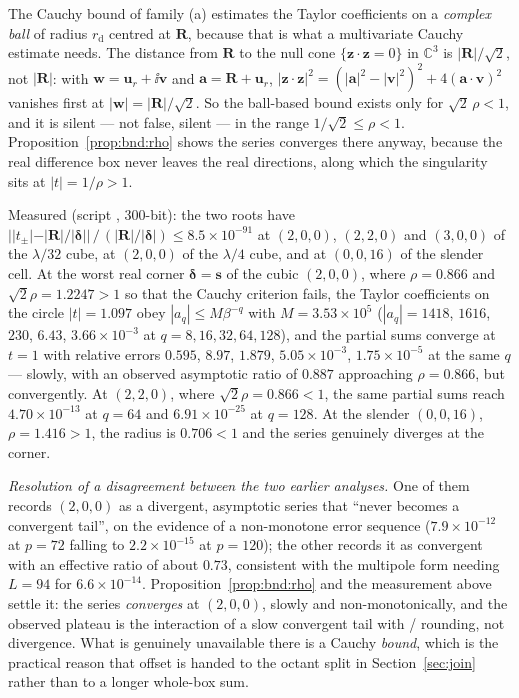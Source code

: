 \begin{remark}
\label{rem:bnd:two}
The Cauchy bound of family (a) estimates the Taylor coefficients on a \emph{complex ball}
of radius $r_{\mathrm{d}}$ centred at $\mathbf{R}$, because that is what a multivariate
Cauchy estimate needs. The distance from $\mathbf{R}$ to the null cone
$\{\mathbf{z}\cdot\mathbf{z} = 0\}$ in $\mathbb{C}^3$ is $|\mathbf{R}|/\sqrt2$, not
$|\mathbf{R}|$: with $\mathbf{w} = \mathbf{u}_r + \ii\mathbf{v}$ and
$\mathbf{a} = \mathbf{R}+\mathbf{u}_r$, $|\mathbf{z}\cdot\mathbf{z}|^2 =
(|\mathbf{a}|^2-|\mathbf{v}|^2)^2 + 4(\mathbf{a}\cdot\mathbf{v})^2$ vanishes first at
$|\mathbf{w}| = |\mathbf{R}|/\sqrt2$. So the ball-based bound exists only for
$\sqrt2\,\rho < 1$, and it is silent --- not false, silent --- in the range
$1/\sqrt2 \le \rho < 1$. Proposition~\ref{prop:bnd:rho} shows the series converges there
anyway, because the real difference box never leaves the real directions, along which the
singularity sits at $|t| = 1/\rho > 1$.

Measured (script , $300$-bit): the two roots have
$||t_\pm| - |\mathbf{R}|/|\boldsymbol{\delta}||\,/\,(|\mathbf{R}|/|\boldsymbol{\delta}|)
\le 8.5\times10^{-91}$ at $(2,0,0)$, $(2,2,0)$ and $(3,0,0)$ of the $\lambda/32$ cube, at
$(2,0,0)$ of the $\lambda/4$ cube, and at $(0,0,16)$ of the slender cell. At the worst
real corner $\boldsymbol{\delta} = \mathbf{s}$ of the cubic $(2,0,0)$, where
$\rho = 0.866$ and $\sqrt2\rho = 1.2247 > 1$ so that the Cauchy criterion fails, the
Taylor coefficients on the circle $|t| = 1.097$ obey $|a_q| \le M\beta^{-q}$ with
$M = 3.53\times10^{5}$ ($|a_q| = 1418$, $1616$, $230$, $6.43$, $3.66\times10^{-3}$ at
$q = 8,16,32,64,128$), and the partial sums converge at $t = 1$ with relative errors
$0.595$, $8.97$, $1.879$, $5.05\times10^{-3}$, $1.75\times10^{-5}$ at the same $q$ ---
slowly, with an observed asymptotic ratio of $0.887$ approaching $\rho = 0.866$, but
convergently. At $(2,2,0)$, where $\sqrt2\rho = 0.866 < 1$, the same partial sums reach
$4.70\times10^{-13}$ at $q = 64$ and $6.91\times10^{-25}$ at $q = 128$. At the slender
$(0,0,16)$, $\rho = 1.416 > 1$, the radius is $0.706 < 1$ and the series genuinely
diverges at the corner.

\emph{Resolution of a disagreement between the two earlier analyses.} One of them records
$(2,0,0)$ as a divergent, asymptotic series that ``never becomes a convergent tail'', on
the evidence of a non-monotone  error sequence
($7.9\times10^{-12}$ at $p = 72$ falling to $2.2\times10^{-15}$ at $p = 120$); the other
records it as convergent with an effective ratio of about $0.73$, consistent with the
multipole form needing $L = 94$ for $6.6\times10^{-14}$. Proposition~\ref{prop:bnd:rho}
and the measurement above settle it: the series \emph{converges} at $(2,0,0)$, slowly and
non-monotonically, and the observed plateau is the interaction of a slow convergent tail
with / rounding, not divergence. What is genuinely
unavailable there is a Cauchy \emph{bound}, which is the practical reason that offset is
handed to the octant split in Section~\ref{sec:join} rather than to a longer whole-box
sum.
\end{remark}
